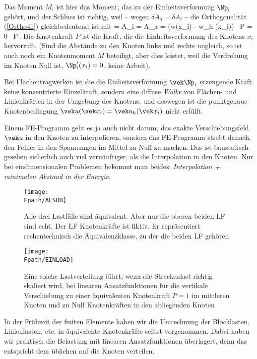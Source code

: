Das Moment $M_i$ ist hier das Moment, das zu der Einheitsverformung $\Np_i$ geh\"{o}rt, und
der Schluss ist richtig, weil -- wegen $\delta A_a = \delta A_i$ -- die Orthogonalit\"{a}t
(\ref{Ortho41}) gleichbedeutend ist mit
 = \delta A_i = \delta A_a = (w(x_i) - w_{h} (x_i)) \times \, P = 0 \times \, P\,.
\efoo
Die Knotenkraft $P$ ist die Kraft, die die Einheitsverformung des Knotens $x_i$
hervorruft. (Sind die Abst\"{a}nde zu den Knoten links und rechts ungleich, so ist auch noch
ein Knotenmoment $M$ beteiligt, aber dies leistet, weil die Verdrehung im Knoten Null
ist, $\Np_i'(x_i ) = 0$, keine Arbeit).

Bei Fl\"{a}chentragwerken ist die die Einheitsverformung $\vek \Np_i $ erzeugende Kraft
keine konzentrierte Einzelkraft, sondern eine diffuse {\em  Wolke} von Fl\"{a}chen- und
Linienkr\"{a}ften in der Umgebung des Knotens, und deswegen ist die punktgenaue
Knotenbedingung $\vek u(\vek x_i) = \vek u_{h} (\vek x_i)$ nicht erf\"{u}llt.

Einem FE-Programm geht es ja auch nicht darum, das exakte Verschiebungsfeld $\vek u$ in
den Knoten zu interpolieren, sondern das FE-Programm strebt danach, den Fehler in den
Spannungen im Mittel zu Null zu machen. Das ist baustatisch gesehen sicherlich auch viel
vern\"{u}nftiger, als die Interpolation in den Knoten. Nur bei eindimensionalen Problemen
bekommt man beides: {\em  Interpolation + minimalen Abstand in der Energie}.

\begin{figure}[tbp]
\if {} \sidecaption \fi
\texttt{[image: \\Fpath/ALSOB]}
\caption{Alle drei Lastf\"{a}lle sind \"{a}quivalent. Aber nur die oberen beiden LF sind \hlq
echt\grq. Der LF Knotenkr\"{a}fte ist fiktiv. Er repr\"{a}sentiert rechentechnisch die
\"{A}quivalenzklasse, zu der die beiden LF geh\"{o}ren} \label{Alsob}
\end{figure}%
\begin{figure}[tbp]
\if {} \sidecaption \fi
\texttt{[image: \\Fpath/EINLOAD]}
\caption{Eine solche Lastverteilung f\"{u}hrt, wenn die Streckenlast richtig skaliert wird,
bei linearen Ansatzfunktionen f\"{u}r die vertikale Verschiebung zu einer \"{a}quivalenten
Knotenkraft $P = 1$ im mittleren Knoten und zu Null Knotenkr\"{a}ften in den abliegenden
Knoten} \label{Einload}
\end{figure}%
In der Fr\"{u}hzeit der finiten Elemente haben wir die Umrechnung der Blocklasten,
Linienlasten, etc. in \"{a}quivalente Knotenkr\"{a}fte selbst vorgenommen. Dabei haben wir
praktisch die Belastung mit linearen Ansatzfunktionen \"{u}berlagert, denn das entspricht
dem \"{u}blichen \hlq auf die Knoten verteilen\grq.

